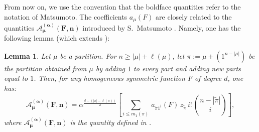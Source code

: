 \documentclass[11pt]{amsart}
\theoremstyle{plain}
\newtheorem{lemma}{Lemma}[section]
\theoremstyle{remark}
\begin{document}
From now on, we use the convention that
the boldface quantities refer to the notation of Matsumoto.
The coefficients $a_\mu(F)$ are closely related to the quantities
$\bm{\mathcal{A}_\mu^{(\alpha)}(F,n)}$ introduced by S.~Matsumoto \cite{MatsumotoOddJM}.
Namely, one has the following lemma (which extends \cite[Lemma 8.5]{MatsumotoOddJM}):
\begin{lemma}
    Let $\mu$ be a partition.
    For $n \geq |\mu|+\ell(\mu)$, let $\pi := \mu + (1^{n-|\mu|})$ be the partition obtained from $\mu$ by adding $1$ to every part and adding new parts equal to $1$.
    Then, for any homogeneous symmetric function $F$ of degree $d$, one has:
    \[\bm{\mathcal{A}_\mu^{(\alpha)}(F,n)} =
    \alpha^{\frac{d-(|\pi|-\ell(\pi))}{2}}
    \left[ \sum_{i \leq m_1(\pi)}\,
        a_{\tilde{\pi} 1^i}(F)\, z_{\tilde{\pi}} \, i!  \, 
            \binom{n-|\tilde{\pi}|}{i} \right],\]
    \label{LemLinkMatsumoto}
    where $\bm{\mathcal{A}_\mu^{(\alpha)}(F,n)}$ is the quantity defined in 
    \cite[Section 8.3]{MatsumotoOddJM}.
\end{lemma}
\end{document}
